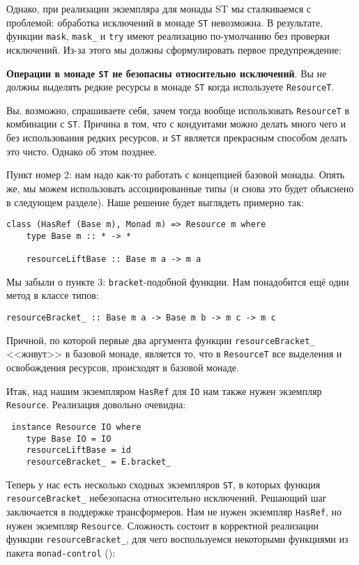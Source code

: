 Однако, при реализации экземпляра для монады ST мы сталкиваемся с проблемой:
обработка исключений в 
монаде \lstinline{ST} невозможна. В результате, функции \lstinline'mask',
\lstinline'mask_' и \lstinline'try' имеют
реализацию по-умолчанию без проверки исключений. Из-за этого мы должны сформулировать первое
предупреждение:

\textbf{Операции в монаде \lstinline{ST} не безопасны относительно исключений}. Вы не должны выделять
редкие ресурсы в монаде \lstinline{ST} когда используете \lstinline'ResourceT'.

Вы. возможно, спрашиваете себя, зачем тогда вообще использовать \verb'ResourceT' в комбинации с \verb'ST'. Причина в том, что с кондуитами можно делать много чего и без использования редких ресурсов, и \verb'ST' является прекрасным способом делать это чисто. Однако об этом позднее.

Пункт номер 2: нам надо как-то работать с концепцией базовой монады. Опять же, мы можем
использовать ассоциированные типы (и снова это будет объяснено в следующем разделе). 
Наше решение будет выглядеть примерно так:
\begin{lstlisting}
class (HasRef (Base m), Monad m) => Resource m where
    type Base m :: * -> *

    resourceLiftBase :: Base m a -> m a 
\end{lstlisting}

Мы забыли о пункте 3: \verb'bracket'-подобной функции. Нам понадобится ещё один метод в классе
типов:
\begin{lstlisting}
resourceBracket_ :: Base m a -> Base m b -> m c -> m c 
\end{lstlisting}
Причной, по которой первые два аргумента функции \lstinline'resourceBracket_' <<живут>> в
базовой монаде, является то, что в \lstinline'ResourceT' все выделения и освобождения
ресурсов, происходят в базовой монаде.

Итак, над нашим экземпляром \lstinline'HasRef' для \lstinline'IO' нам также нужен экземпляр
\lstinline'Resource'. Реализация довольно очевидна:
\begin{lstlisting}
 instance Resource IO where
    type Base IO = IO
    resourceLiftBase = id
    resourceBracket_ = E.bracket_
\end{lstlisting}

Теперь у нас есть несколько сходных экземпляров \lstinline'ST', в которых функция
\lstinline'resourceBracket_' небезопасна относительно исключений. Решающий шаг заключается
в поддержке трансформеров. Нам не нужен
экземпляр \lstinline'HasRef', но нужен экземпляр \lstinline'Resource'.
Сложность состоит в корректной реализации функции \lstinline'resourceBracket_', для чего
воспользуемся некоторыми функциями из пакета \texttt{monad-control}
():


